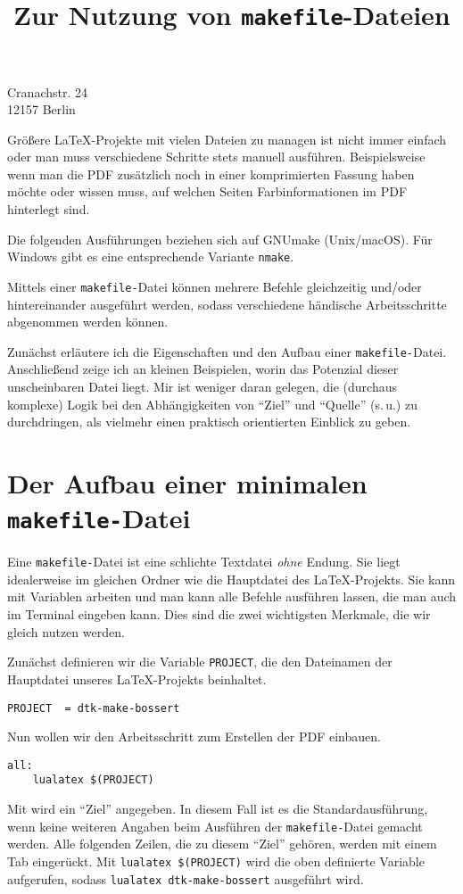 \documentclass[ngerman]{dtk}
\begin{document}
\title{Zur Nutzung von \texttt{makefile}-Dateien}
%
{Cranachstr. 24\\
12157 Berlin\\
}
\maketitle

Größere \LaTeX -Projekte mit vielen Dateien zu managen ist nicht immer einfach
oder man muss verschiedene Schritte stets manuell ausführen.
Beispielsweise wenn man die PDF zusätzlich noch in einer komprimierten
Fassung haben möchte oder wissen muss, auf welchen Seiten Farbinformationen im PDF
hinterlegt sind.

Die folgenden Ausführungen beziehen sich auf GNUmake (Unix/macOS).
Für Windows gibt es eine entsprechende Variante \texttt{nmake}.


Mittels einer \texttt{makefile-}Datei können mehrere Befehle gleichzeitig und/oder
hintereinander ausgeführt werden, sodass verschiedene händische Arbeitsschritte abgenommen werden können.

Zunächst erläutere ich die Eigenschaften und den Aufbau einer \texttt{makefile-}Datei.
Anschließend zeige ich an kleinen Beispielen,
worin das Potenzial dieser unscheinbaren Datei liegt.
Mir ist weniger daran gelegen,
die (durchaus komplexe) Logik bei den Abhängigkeiten von \enquote{Ziel}
und \enquote{Quelle} (s.\,u.) zu durchdringen,
als vielmehr einen praktisch orientierten Einblick zu geben.

\section{Der Aufbau einer minimalen \texttt{makefile-}Datei}
Eine \texttt{makefile-}Datei ist eine schlichte Textdatei \emph{ohne} Endung.
Sie liegt idealerweise im gleichen Ordner wie die Hauptdatei des \LaTeX -Projekts.
Sie kann mit Variablen arbeiten und man kann alle Befehle ausführen lassen,
die man auch im Terminal eingeben kann.
Dies sind die zwei wichtigsten Merkmale,
die wir gleich nutzen werden.

Zunächst definieren wir die Variable \texttt{PROJECT},
die den Dateinamen der Hauptdatei unseres \LaTeX -Projekts beinhaltet.
\begin{lstlisting}[style=number]
PROJECT  = dtk-make-bossert
\end{lstlisting}

Nun wollen wir den Arbeitsschritt zum Erstellen der PDF einbauen.
\begin{lstlisting}[style=number]
all:
    lualatex $(PROJECT)
\end{lstlisting}
Mit  wird ein \enquote{Ziel} angegeben.
In diesem Fall ist es die Standardausführung,
wenn keine weiteren Angaben beim Ausführen der
\texttt{makefile-}Datei gemacht werden.
Alle folgenden Zeilen, die zu diesem \enquote{Ziel} gehören,
werden mit einem Tab eingerückt.
Mit \texttt{lualatex \$(PROJECT)} wird die oben definierte
Variable aufgerufen, sodass \texttt{lualatex dtk-make-bossert}
ausgeführt wird.
\end{document}
